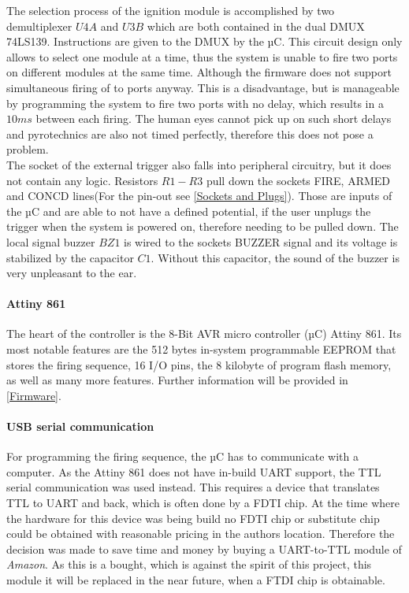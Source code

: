 \noindent The selection process of the ignition module is accomplished by two demultiplexer $U4A$ and $U3B$ which are both contained in the dual DMUX 74LS139. Instructions are given to the DMUX by the µC. This circuit design only allows to select one module at a time, thus the system is unable to fire two ports on different modules at the same time. Although the firmware does not support simultaneous firing of to ports anyway. This is a disadvantage, but is manageable by programming the system to fire two ports with no delay, which results in a $10ms$ between each firing. The human eyes cannot pick up on such short delays and pyrotechnics are also not timed perfectly, therefore this does not pose a problem.\\

\noindent The socket of the external trigger also falls into peripheral circuitry, but  it does not contain any logic. Resistors $R1-R3$ pull down the sockets FIRE, ARMED and CONCD lines(For the pin-out see \cref{Sockets and Plugs}). Those are inputs of the µC and are able to not have a defined potential, if the user unplugs the trigger when the system is powered on, therefore needing to be pulled down. The local signal buzzer $BZ1$ is wired to the sockets BUZZER signal and its voltage is stabilized by the capacitor $C1$. Without this capacitor, the sound of the buzzer is very unpleasant to the ear.\\

\paragraph{Attiny 861}
The heart of the controller is the 8-Bit AVR micro controller (µC) Attiny 861. Its most notable features are the 512 bytes in-system programmable EEPROM that stores the firing sequence, 16 I/O pins, the 8 kilobyte of program flash memory, as well as many more features. Further information will be provided in \cref{Firmware}.


\paragraph{USB serial communication}
For programming the firing sequence, the µC has to communicate with a computer. As the Attiny 861 does not have in-build UART support, the TTL serial communication was used instead. This requires a device that translates TTL to UART and back, which is often done by a FDTI chip. At the time where the hardware for this device was being build no FDTI chip or substitute chip could be obtained with reasonable pricing in the authors location. Therefore the decision was made to save time and money by buying a UART-to-TTL module of \textit{Amazon}. As this is a bought, which is against the spirit of this project, this module it will be replaced in the near future, when a FTDI chip is obtainable. \\

